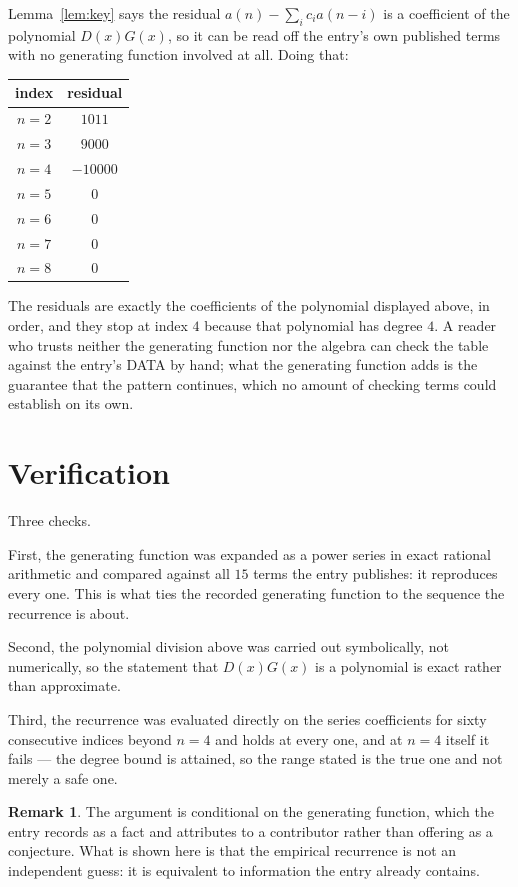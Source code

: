 \documentclass[11pt,a4paper]{article}
\theoremstyle{plain}
\theoremstyle{definition}
\newtheorem{remark}[theorem]{Remark}
\begin{document}
Lemma~\ref{lem:key} says the residual $a(n)-\sum_ic_ia(n-i)$ is a coefficient of the
polynomial $D(x)G(x)$, so it can be read off the entry's own published terms with no
generating function involved at all. Doing that:
\begin{center}
\begin{tabular}{cc}
index & residual \\ \hline
$n=2$ & $1011$ \\
$n=3$ & $9000$ \\
$n=4$ & $-10000$ \\
$n=5$ & $0$ \\
$n=6$ & $0$ \\
$n=7$ & $0$ \\
$n=8$ & $0$
\end{tabular}
\end{center}
The residuals are exactly the coefficients of the polynomial displayed above, in order, and
they stop at index $4$ because that polynomial has degree $4$. A reader who trusts
neither the generating function nor the algebra can check the table against the entry's DATA
by hand; what the generating function adds is the guarantee that the pattern continues, which
no amount of checking terms could establish on its own.

\section{Verification}

Three checks.

First, the generating function was expanded as a power series in exact rational arithmetic and
compared against all $15$ terms the entry publishes: it reproduces every one. This is
what ties the recorded generating function to the sequence the recurrence is about.

Second, the polynomial division above was carried out symbolically, not numerically, so the
statement that $D(x)G(x)$ is a polynomial is exact rather than approximate.

Third, the recurrence was evaluated directly on the series coefficients for sixty consecutive
indices beyond $n=4$ and holds at every one, and at $n=4$ itself it fails --- the
degree bound is attained, so the range stated is the true one and not merely a safe one.

\begin{remark}
The argument is conditional on the generating function, which the entry records as a fact and
attributes to a contributor rather than offering as a conjecture. What is shown here is that
the empirical recurrence is not an independent guess: it is equivalent to information the
entry already contains.
\end{remark}
\end{document}

